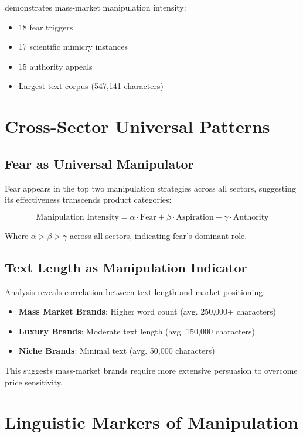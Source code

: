  demonstrates mass-market manipulation intensity:
\begin{itemize}
    \item 18 fear triggers
    \item 17 scientific mimicry instances
    \item 15 authority appeals
    \item Largest text corpus (547,141 characters)
\end{itemize}

\section{Cross-Sector Universal Patterns}

\subsection{Fear as Universal Manipulator}

Fear appears in the top two manipulation strategies across all sectors, suggesting its effectiveness transcends product categories:

\begin{equation}
\text{Manipulation Intensity} = \alpha \cdot \text{Fear} + \beta \cdot \text{Aspiration} + \gamma \cdot \text{Authority}
\end{equation}

Where $\alpha > \beta > \gamma$ across all sectors, indicating fear's dominant role.

\subsection{Text Length as Manipulation Indicator}

Analysis reveals correlation between text length and market positioning:

\begin{itemize}
    \item \textbf{Mass Market Brands}: Higher word count (avg. 250,000+ characters)
    \item \textbf{Luxury Brands}: Moderate text length (avg. 150,000 characters)
    \item \textbf{Niche Brands}: Minimal text (avg. 50,000 characters)
\end{itemize}

This suggests mass-market brands require more extensive persuasion to overcome price sensitivity.

\section{Linguistic Markers of Manipulation}

